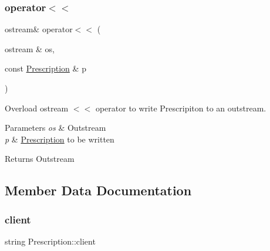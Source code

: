 \mbox{\label{classPrescription_a3daeb997a2f3f9666159cf018d0d1c28}} 
\subsubsection{\texorpdfstring{operator$<$$<$}{operator<<}\hspace{0.1cm}{\footnotesize\ttfamily [2/2]}}
{\footnotesize\ttfamily ostream\& operator$<$$<$ (\begin{DoxyParamCaption}\item[{ostream \&}]{os,  }\item[{const \hyperlink{classPrescription}{Prescription} \&}]{p }\end{DoxyParamCaption})\hspace{0.3cm}{\ttfamily [friend]}}



Overload ostream $<$$<$ operator to write Prescripiton to an outstream. 


\begin{DoxyParams}{Parameters}
{\em os} & Outstream\\
\hline
{\em p} & \hyperlink{classPrescription}{Prescription} to be written\\
\hline
\end{DoxyParams}
\begin{DoxyReturn}{Returns}
Outstream 
\end{DoxyReturn}


\subsection{Member Data Documentation}
\mbox{\label{classPrescription_a3a2d122c0229cd7985595cae3ab497c3}} 
\subsubsection{\texorpdfstring{client}{client}}
{\footnotesize\ttfamily string Prescription\+::client\hspace{0.3cm}{\ttfamily [private]}}

\mbox{\label{classPrescription_abf1e3c58a207e521294815884ffc6682}} 
